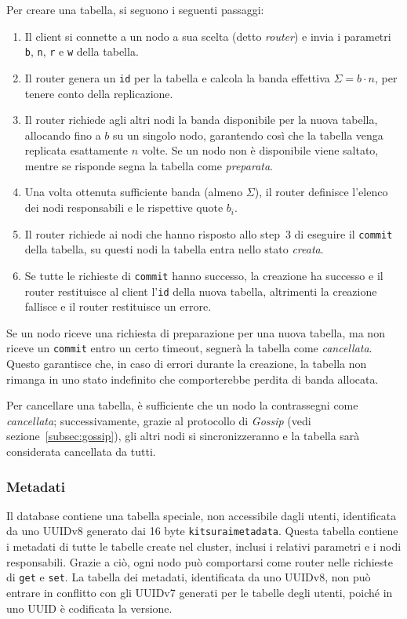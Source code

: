 Per creare una tabella, si seguono i seguenti passaggi:
\begin{enumerate}
    \item Il client si connette a un nodo a sua scelta (detto \emph{router}) e invia i parametri \texttt{b}, \texttt{n}, \texttt{r} e \texttt{w} della tabella.
    \item Il router genera un \texttt{id} per la tabella e calcola la banda effettiva $\Sigma = b \cdot n$, per tenere conto della replicazione.
    \item Il router richiede agli altri nodi la banda disponibile per la nuova tabella, allocando fino a $b$ su un singolo nodo, garantendo così che la tabella venga replicata esattamente $n$ volte. Se un nodo non è disponibile viene saltato, mentre se risponde segna la tabella come \emph{preparata}.
    \item Una volta ottenuta sufficiente banda (almeno $\Sigma$), il router definisce l'elenco dei nodi responsabili e le rispettive quote $b_i$.
    \item Il router richiede ai nodi che hanno risposto allo step~3 di eseguire il \texttt{commit} della tabella, su questi nodi la tabella entra nello stato \emph{creata}.
    \item Se tutte le richieste di \texttt{commit} hanno successo, la creazione ha successo e il router restituisce al client l'\texttt{id} della nuova tabella, altrimenti la creazione fallisce e il router restituisce un errore.
\end{enumerate}

Se un nodo riceve una richiesta di preparazione per una nuova tabella, ma non riceve un \texttt{commit} entro un certo timeout, segnerà la tabella come \emph{cancellata}.
Questo garantisce che, in caso di errori durante la creazione, la tabella non rimanga in uno stato indefinito che comporterebbe perdita di banda allocata.

Per cancellare una tabella, è sufficiente che un nodo la contrassegni come \emph{cancellata}; successivamente, grazie al protocollo di \emph{Gossip} (vedi sezione~\ref{subsec:gossip}), gli altri nodi si sincronizzeranno e la tabella sarà considerata cancellata da tutti.

\subsubsection{Metadati}
\label{subsubsec:metadati}

Il database contiene una tabella speciale, non accessibile dagli utenti, identificata da uno UUIDv8 generato dai 16 byte \texttt{kitsuraimetadata}.
Questa tabella contiene i metadati di tutte le tabelle create nel cluster, inclusi i relativi parametri e i nodi responsabili.
Grazie a ciò, ogni nodo può comportarsi come router nelle richieste di \texttt{get} e \texttt{set}.
La tabella dei metadati, identificata da uno UUIDv8, non può entrare in conflitto con gli UUIDv7 generati per le tabelle degli utenti, poiché in uno UUID è codificata la versione.

